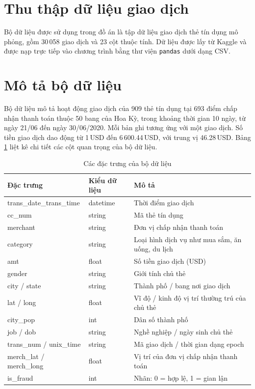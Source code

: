 \section{Thu thập dữ liệu giao dịch}
Bộ dữ liệu được sử dụng trong đồ án là tập dữ liệu giao dịch thẻ tín dụng mô phỏng, gồm 30\,058 giao dịch và 23 cột thuộc tính. Dữ liệu được lấy từ Kaggle và được nạp trực tiếp vào chương trình bằng thư viện \texttt{pandas} \cite{mckinney2010pandas} dưới dạng CSV.





\section{Mô tả bộ dữ liệu}
Bộ dữ liệu mô tả hoạt động giao dịch của 909 thẻ tín dụng tại 693 điểm chấp nhận thanh toán thuộc 50 bang của Hoa Kỳ, trong khoảng thời gian 10 ngày, từ ngày 21/06 đến ngày 30/06/2020. Mỗi bản ghi tương ứng với một giao dịch. Số tiền giao dịch dao động từ 1\,USD đến 6\,600{.}44\,USD, với trung vị 46{.}28\,USD. Bảng \ref{tab:data_fields} liệt kê chi tiết các cột quan trọng của bộ dữ liệu.

\begin{table}[H]
\centering
\fontsize{11}{13.6}\selectfont
\renewcommand{\arraystretch}{1.2}
\setlength{\tabcolsep}{6pt}
\begin{tabularx}{\textwidth}{|p{4.2cm}|p{2.2cm}|X|}
\hline
\textbf{Đặc trưng} & \textbf{Kiểu dữ liệu} & \textbf{Mô tả} \\
\hline
trans\_date\_trans\_time & datetime & Thời điểm giao dịch \\
\hline
cc\_num & string & Mã thẻ tín dụng \\
\hline
merchant & string & Đơn vị chấp nhận thanh toán \\
\hline
category & string & Loại hình dịch vụ như mua sắm, ăn uống, du lịch \\
\hline
amt & float & Số tiền giao dịch (USD) \\
\hline
gender & string & Giới tính chủ thẻ \\
\hline
city / state & string & Thành phố / bang nơi giao dịch \\
\hline
lat / long & float & Vĩ độ / kinh độ vị trí thường trú của chủ thẻ \\
\hline
city\_pop & int & Dân số thành phố \\
\hline
job / dob & string & Nghề nghiệp / ngày sinh chủ thẻ \\
\hline
trans\_num / unix\_time & string & Mã giao dịch / thời gian dạng epoch \\
\hline
merch\_lat / merch\_long & float & Vị trí của đơn vị chấp nhận thanh toán \\
\hline
is\_fraud & int & Nhãn: 0 = hợp lệ, 1 = gian lận \\
\hline
\end{tabularx}
\caption{Các đặc trưng của bộ dữ liệu}
\label{tab:data_fields}
\end{table}

